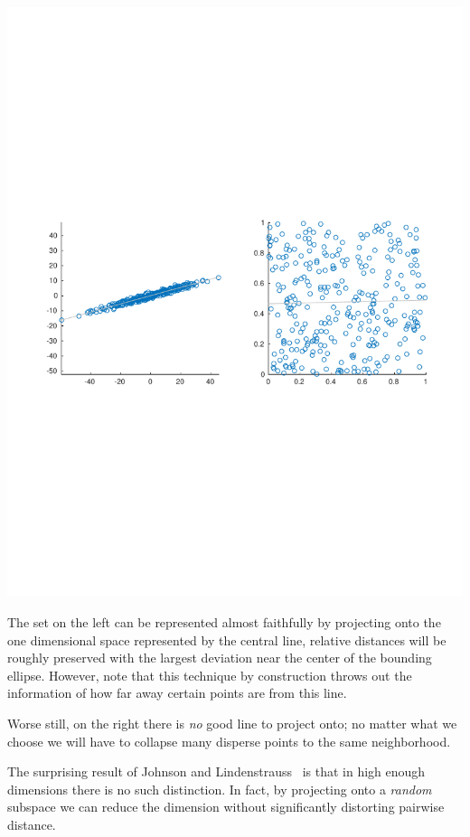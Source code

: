 \documentclass[11pt]{article}
\begin{document}
\begin{center}
    \includegraphics[trim=0 280 0 280, clip, width=\textwidth]{2dplots.pdf}
\end{center}

The set on the left can be represented almost faithfully by projecting onto the
one dimensional space represented by the central line, relative distances will
be roughly preserved with the largest deviation near the center of the bounding
ellipse. However, note that this technique by construction throws out the
information of how far away certain points are from this line.

Worse still, on the right there is \emph{no} good line to project onto; no
matter what we choose we will have to collapse many disperse points to the same
neighborhood.

The surprising result of Johnson and Lindenstrauss~\cite{oldpaper} is that in
high enough dimensions there is no such distinction. In fact, by projecting onto
a \textit{random} subspace we can reduce the dimension without significantly
distorting pairwise distance.
\end{document}
